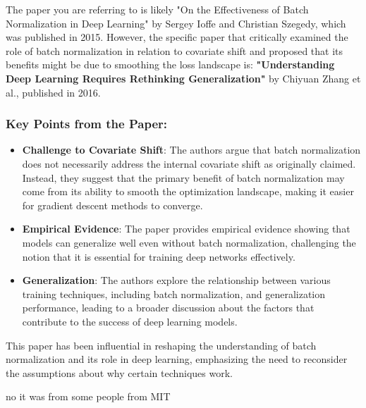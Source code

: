 \begin{botresponse}

The paper you are referring to is likely "On the Effectiveness of Batch Normalization in Deep Learning" by Sergey Ioffe and Christian Szegedy, which was published in 2015. However, the specific paper that critically examined the role of batch normalization in relation to covariate shift and proposed that its benefits might be due to smoothing the loss landscape is:
\textbf{"Understanding Deep Learning Requires Rethinking Generalization"} by Chiyuan Zhang et al., published in 2016.

\subsubsection{Key Points from the Paper:}

\begin{itemize}
\item \textbf{Challenge to Covariate Shift}: The authors argue that batch normalization does not necessarily address the internal covariate shift as originally claimed. Instead, they suggest that the primary benefit of batch normalization may come from its ability to smooth the optimization landscape, making it easier for gradient descent methods to converge.
\item \textbf{Empirical Evidence}: The paper provides empirical evidence showing that models can generalize well even without batch normalization, challenging the notion that it is essential for training deep networks effectively.
\item \textbf{Generalization}: The authors explore the relationship between various training techniques, including batch normalization, and generalization performance, leading to a broader discussion about the factors that contribute to the success of deep learning models.
\end{itemize}

This paper has been influential in reshaping the understanding of batch normalization and its role in deep learning, emphasizing the need to reconsider the assumptions about why certain techniques work.

\end{botresponse}

\begin{userprompt}

no it was from some people from MIT

\end{userprompt}

